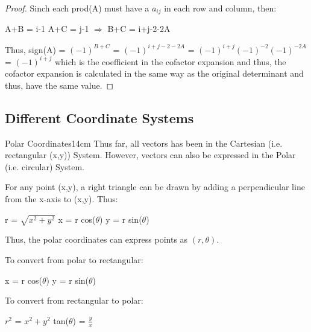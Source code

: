 \begin{proof}
        Sinch each prod(A) must have a $a_{ij}$ in each row and column, then:

        \hspace{0.5cm}
        A+B = i-1
        \hspace{1cm}
        A+C = j-1
        \hspace{1cm}
        $\Rightarrow$
        \hspace{1cm}
        B+C = i+j-2-2A

        Thus, sign(A) = $(-1)^{B+C}$ = $(-1)^{i+j-2-2A}$
        = $(-1)^{i+j}(-1)^{-2}(-1)^{-2A}$
        = $(-1)^{i+j}$
        which is the coefficient in the cofactor expansion
        and thus, the cofactor expansion is calculated in the same way
        as the original determinant and thus, have the same value.
    \end{proof}

    \newpage





\subsection{ Different Coordinate Systems }

    \begin{definition}{Polar Coordinates}{14cm}
        Thus far, all vectors has been in the Cartesian
        (i.e. rectangular (x,y)) System.
        However, vectors can also be expressed in the Polar
        (i.e. circular) System.

        \vspace{0.3cm}

        For any point (x,y), a right triangle can be drawn by
        adding a perpendicular line from the x-axis to (x,y).
        Thus:

        \hspace{0.5cm}
        r = $\sqrt{x^2 + y^2}$
        \hspace{1cm}
        x = r cos($\theta$)
        \hspace{1cm}
        y = r sin($\theta$)

        Thus, the polar coordinates can express points as $(r,\theta)$.

        \hspace{0.5cm}
        To convert from polar to rectangular:

        \hspace{1cm}
        x = r cos($\theta$)
        \hspace{1cm}
        y = r sin($\theta$)

        \hspace{0.5cm}
        To convert from rectangular to polar:

        \hspace{1cm}
        $r^2$ = $x^2 + y^2$
        \hspace{1cm}
        tan($\theta$) = $\frac{y}{x}$
    \end{definition}

